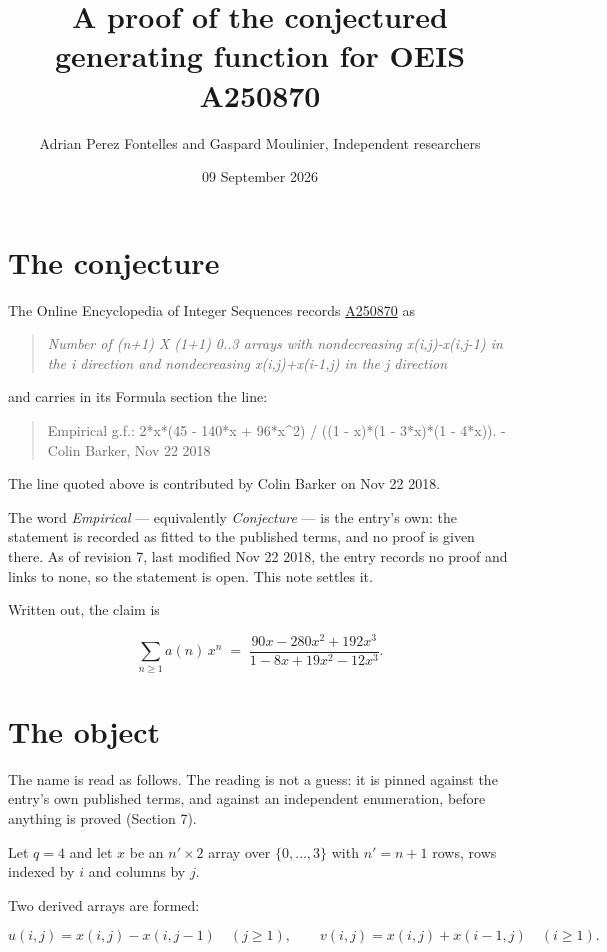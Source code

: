 \documentclass[11pt]{article}
\title{A proof of the conjectured generating function for OEIS A250870}
\author{Adrian Perez Fontelles and Gaspard Moulinier, Independent researchers}
\date{09 September 2026}
\theoremstyle{definition}
\begin{document}
\maketitle
\section{The conjecture}

The Online Encyclopedia of Integer Sequences records \href{https://oeis.org/A250870}{A250870} as

\begin{quote}\itshape Number of (n+1) X (1+1) 0..3 arrays with nondecreasing x(i,j)-x(i,j-1) in the i direction and nondecreasing x(i,j)+x(i-1,j) in the j direction\end{quote}

and carries in its Formula section the line:

\begin{quote}\ttfamily Empirical g.f.: 2*x*(45 - 140*x + 96*x\textasciicircum{}2) / ((1 - x)*(1 - 3*x)*(1 - 4*x)). - Colin Barker, Nov 22 2018\end{quote}

The line quoted above is contributed by Colin Barker on Nov 22 2018.

The word {\itshape Empirical} --- equivalently {\itshape Conjecture} --- is the entry's own: the statement is recorded as fitted to the published terms, and no proof is given there. As of revision 7, last modified Nov 22 2018, the entry records no proof and links to none, so the statement is open. This note settles it.

Written out, the claim is

\[\sum_{n \ge 1} a(n)\,x^n \;=\; \frac{90x - 280x^{2} + 192x^{3}}{1 - 8x + 19x^{2} - 12x^{3}}.\]

\section{The object}

The name is read as follows. The reading is not a guess: it is pinned against the entry's own published terms, and against an independent enumeration, before anything is proved (Section 7).

Let $q = 4$ and let $x$ be an $n' \times 2$ array over $\{0,\dots,3\}$ with $n' = n + 1$ rows, rows indexed by $i$ and columns by $j$.

Two derived arrays are formed:

\[u(i,j) = x(i,j) - x(i,j{-}1)\quad (j \ge 1), \qquad v(i,j) = x(i,j) + x(i{-}1,j)\quad (i \ge 1).\]
\end{document}
